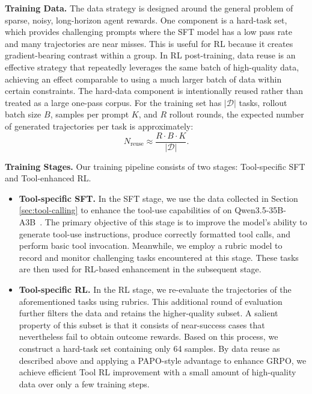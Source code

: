 \textbf{Training Data.} The data strategy is designed around the general problem of sparse, noisy, long-horizon agent rewards. One component is a hard-task set, which provides challenging prompts where the SFT model has a low pass rate and many trajectories are near misses. This is useful for RL because it creates gradient-bearing contrast within a group. 
In RL post-training, data reuse is an effective strategy that repeatedly leverages the same batch of high-quality data, achieving an effect comparable to using a much larger batch of data within certain constraints. The hard-data component is intentionally reused rather than treated as a large one-pass corpus. For the training set has $|\mathcal{D}|$ tasks, rollout batch size $B$, samples per prompt $K$, and $R$ rollout rounds, the expected number of generated trajectories per task is approximately:
\begin{equation}
N_{\mathrm{reuse}}
\approx
\frac{R \cdot B \cdot K}{|\mathcal{D}|}.
\end{equation}

\textbf{Training Stages.} Our training pipeline consists of two stages: Tool-specific SFT and Tool-enhanced RL.
\begin{itemize}
    \item \textbf{Tool-specific SFT.} In the SFT stage, we use the data collected in Section \ref{sec:tool-calling} to enhance the tool-use capabilities of on Qwen3.5-35B-A3B~\citep{Qwen3.5}. The primary objective of this stage is to improve the model’s ability to generate tool-use instructions, produce correctly formatted tool calls, and perform basic tool invocation. Meanwhile, we employ a rubric model to record and monitor challenging tasks encountered at this stage. These tasks are then used for RL-based enhancement in the subsequent stage.
    \item \textbf{Tool-specific RL.} In the RL stage, we re-evaluate the trajectories of the aforementioned tasks using rubrics. This additional round of evaluation further filters the data and retains the higher-quality subset. A salient property of this subset is that it consists of near-success cases that nevertheless fail to obtain outcome rewards. Based on this process, we construct a hard-task set containing only 64 samples. By data reuse as described above and applying a PAPO-style advantage to enhance GRPO, we achieve efficient Tool RL improvement with a small amount of high-quality data over only a few training steps. 
\end{itemize}


